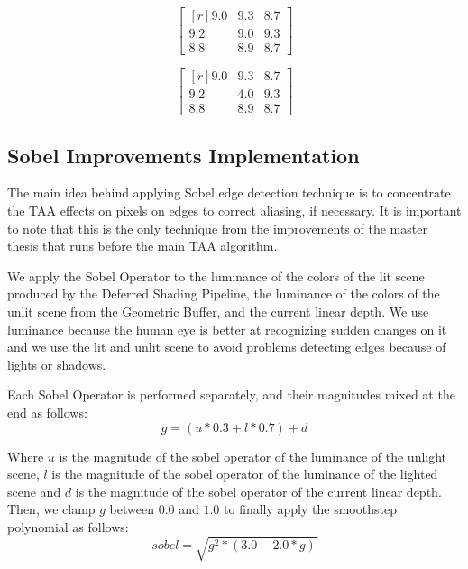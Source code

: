 \documentclass{cslthse-msc}
\begin{document}
\begin{equation}\label{eq:depth_var_not_aliased}
\begin{bmatrix*}[r]
9.0 &  9.3 & 8.7 \\
9.2 &  9.0 & 9.3 \\
8.8 &  8.9 & 8.7
\end{bmatrix*}
\end{equation}

\begin{equation}\label{eq:depth_var_aliased}
\begin{bmatrix*}[r]
9.0 &  9.3 & 8.7 \\
9.2 &  4.0 & 9.3 \\
8.8 &  8.9 & 8.7
\end{bmatrix*}
\end{equation}

\subsection{Sobel Improvements Implementation}
The main idea behind applying Sobel edge detection technique is to concentrate the TAA effects on pixels on edges to correct aliasing, if necessary.  It is important to note that this is the only technique from the improvements of the master thesis that runs before the main TAA algorithm.

We apply the Sobel Operator to the luminance of the colors of the lit scene produced by the Deferred Shading Pipeline, the luminance of the colors of the unlit scene from the Geometric Buffer, and the current linear depth. We use luminance because the human eye is better at recognizing sudden changes on it and we use the lit and unlit scene to avoid problems detecting edges because of lights or shadows. 

Each Sobel Operator is performed separately, and their magnitudes mixed at the end as follows:
\begin{equation} \label{eq:sobel_g}
	g=(u*0.3 +l*0.7)+d 
\end{equation}

Where $u$ is the magnitude of the sobel operator of the luminance of the unlight scene, $l$ is the magnitude of the sobel operator of the luminance of the lighted scene and $d$ is the magnitude of the sobel operator of the current linear depth. \\

Then, we clamp $g$ between $0.0$ and $1.0$ to finally apply the smoothstep polynomial as follows:
\begin{equation} \label{eq:sobel_sqrt}
sobel=\sqrt{g^2*(3.0-2.0*g)} 
\end{equation}
\end{document}
